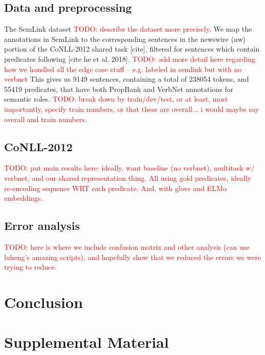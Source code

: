 \documentclass[11pt,a4paper]{article}
\newcommand{\rephrase}[1]{{\sethlcolor{cyan}\hl{#1}}}
\newcommand{\emmatodo}[1]{\textcolor{red}{TODO: #1}}
\begin{document}
\subsection{Data and preprocessing}
The SemLink dataset \cite{palmer2009semlink} \emmatodo{describe the dataset more precisely}. We map the annotations in SemLink to the corresponding sentences in the newswire (nw) portion of the CoNLL-2012 shared task [cite], filtered for sentences which contain predicates following [cite he et al. 2018]. \emmatodo{add more detail here regarding how we handled all the edge case stuff -- e.g. labeled in semlink but with no verbnet}
This gives us 9149 sentences, containing a total of 238054 tokens, and 55419 predicates, that have both PropBank and VerbNet annotations for semantic roles. \emmatodo{break down by train/dev/test, or at least, most importantly, specify train numbers, or that these are overall... i would maybe say overall and train numbers.}

\subsection{CoNLL-2012}

\emmatodo{put main results here: ideally, want baseline (no verbnet), multitask w/ verbnet, and our shared representation thing. All using gold predicates, ideally re-encoding sequence WRT each predicate. And, with glove and ELMo embeddings.}

\subsection{Error analysis}

\emmatodo{here is where we include confusion matrix and other analysis (can use luheng's amazing scripts), and hopefully show that we reduced the errors we were trying to reduce.}

\section{Conclusion}






\appendix

\section{Supplemental Material}
\label{sec:supplemental}
\end{document}
